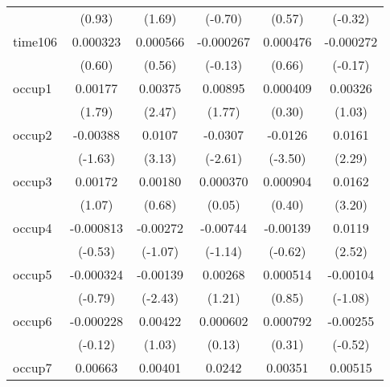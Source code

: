 \begin{table}[htbp]
\begin{tabular}{l*{5}{c}}
            &      (0.93)         &      (1.69)         &     (-0.70)         &      (0.57)         &     (-0.32)         \\
time106     &    0.000323         &    0.000566         &   -0.000267         &    0.000476         &   -0.000272         \\
            &      (0.60)         &      (0.56)         &     (-0.13)         &      (0.66)         &     (-0.17)         \\
occup1      &     0.00177         &     0.00375\sym{*}  &     0.00895         &    0.000409         &     0.00326         \\
            &      (1.79)         &      (2.47)         &      (1.77)         &      (0.30)         &      (1.03)         \\
occup2      &    -0.00388         &      0.0107\sym{**} &     -0.0307\sym{**} &     -0.0126\sym{***}&      0.0161\sym{*}  \\
            &     (-1.63)         &      (3.13)         &     (-2.61)         &     (-3.50)         &      (2.29)         \\
occup3      &     0.00172         &     0.00180         &    0.000370         &    0.000904         &      0.0162\sym{**} \\
            &      (1.07)         &      (0.68)         &      (0.05)         &      (0.40)         &      (3.20)         \\
occup4      &   -0.000813         &    -0.00272         &    -0.00744         &    -0.00139         &      0.0119\sym{*}  \\
            &     (-0.53)         &     (-1.07)         &     (-1.14)         &     (-0.62)         &      (2.52)         \\
occup5      &   -0.000324         &    -0.00139\sym{*}  &     0.00268         &    0.000514         &    -0.00104         \\
            &     (-0.79)         &     (-2.43)         &      (1.21)         &      (0.85)         &     (-1.08)         \\
occup6      &   -0.000228         &     0.00422         &    0.000602         &    0.000792         &    -0.00255         \\
            &     (-0.12)         &      (1.03)         &      (0.13)         &      (0.31)         &     (-0.52)         \\
occup7      &     0.00663\sym{***}&     0.00401         &      0.0242\sym{**} &     0.00351         &     0.00515         \\

\end{tabular}
\end{table}
